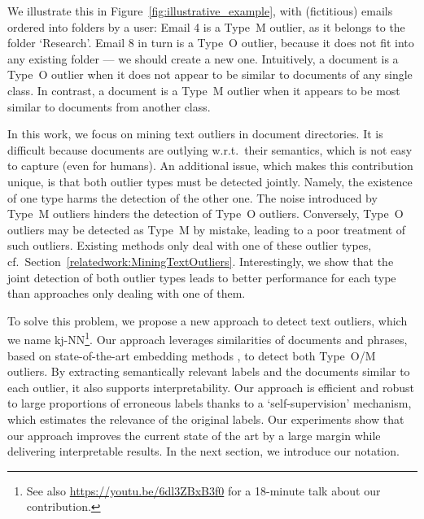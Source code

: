 We illustrate this in Figure~\ref{fig:illustrative_example}, with (fictitious) emails ordered into folders by a user: Email 4 is a Type~M outlier, as it belongs to the folder `Research'. Email 8 in turn is a Type~O outlier, because it does not fit into any existing folder --- we should create a new one. 
Intuitively, a document is a Type~O outlier when it does not appear to be similar to documents of any single class. 
In contrast, a document is a Type~M outlier when it appears to be most similar to documents from another class. 

In this work, we focus on mining text outliers in document directories. %
It is difficult  because documents are outlying w.r.t.\ their semantics, which is not easy to capture (even for humans). 
An additional issue, which makes this contribution unique, is that both outlier types must be detected jointly. 
Namely, the existence of one type harms the detection of the other one. 
The noise introduced by Type~M outliers hinders the detection of Type~O outliers. Conversely, Type~O outliers may be detected as Type~M by mistake, leading to a poor treatment of such outliers.
Existing methods only deal with one of these outlier types, cf.\ Section~\ref{relatedwork:MiningTextOutliers}. Interestingly, we show that the joint detection of both outlier types leads to better performance for each type than approaches only dealing with one of them. 

To solve this problem, we propose a new approach to detect text outliers, which we name \gls{kj-NN}\footnote{See also \url{https://youtu.be/6dl3ZBxB3f0} for a 18-minute talk about our contribution.}. Our approach leverages similarities of documents and phrases, based on state-of-the-art embedding methods \cite{meng2019spherical}, to detect both Type~O/M outliers. By extracting semantically relevant labels and the documents similar to each outlier, it also supports interpretability. Our approach is efficient and robust to large proportions of erroneous labels thanks to a `self-supervision' mechanism, which estimates the relevance of the original labels. 
Our experiments show that our approach improves the current state of the art by a large margin while delivering interpretable results. In the next section, we introduce our notation. 

